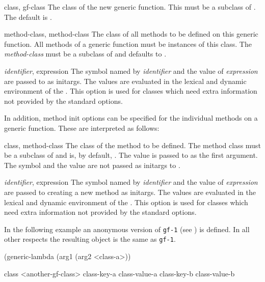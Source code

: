 \begin{optDefinition}
\begin{options}
    \item[class, gf-class] The class of the new generic function.  This must be
    a subclass of .  The default is
    .

    \item[method-class, method-class] The class of all methods to be defined on
    this generic function.  All methods of a generic function must be instances
    of this class.  The {\em method-class} must be a subclass of
     and defaults to .

    \item[{\em identifier}, expression] The symbol named by {\em identifier} and
    the value of {\em expression} are passed to  as initargs.
    The values are evaluated in the lexical and dynamic environment of the
    .  This option is used for classes which need extra
    information not provided by the standard options.
\end{options}
%
In addition, method init options can be specified for the individual
methods on a generic function.  These are interpreted as follows:
%
\begin{options}
    \item[class, method-class]%
    The class of the method to be defined. The method class must be a subclass
    of  and is, by default, . The value is
    passed to  as the first argument. The symbol and the value
    are not passed as initargs to .

    \item[{\em identifier}, expression]%
    The symbol named by {\em identifier} and the value of {\em expression} are
    passed to  creating a new method as initargs.  The values
    are evaluated in the lexical and dynamic environment of the
    .  This option is used for classes which need extra
    information not provided by the standard options.
\end{options}
%
\examples
 In the following example an anonymous version of {\tt gf-1} (see
) is defined.  In all other respects the resulting object
is the same as {\tt gf-1}.
%
{\codeExample
(generic-lambda (arg1 (arg2 <class-a>))

  class <another-gf-class>
  class-key-a class-value-a
  class-key-b class-value-b

}
\end{optDefinition}
